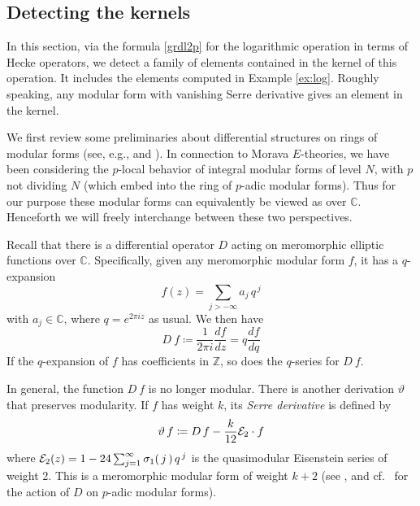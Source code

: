 \documentclass{gtpart}
\theoremstyle{definition}
\theoremstyle{remark}
\newcommand{\mb}[1]{\mathbb{#1}}
\newcommand{\CE}{{\cal E}}
\newcommand{\BC}{{\mb C}}
\newcommand{\BZ}{{\mb Z}}
\newcommand{\si}{\sigma}
\newcommand{\ce}{\coloneqq}
\renewcommand{\=}{\approx}
\renewcommand{\-}{\sim}
\numberwithin{equation}{section}
\numberwithin{thm}{section}
\begin{document}
\subsection{Detecting the kernels}
\label{subsec:thm}

In this section, via the formula \eqref{grdl2p} for the logarithmic operation in terms of Hecke operators, we 
detect a family of elements contained in the kernel of this operation.  
It includes the elements computed in Example \ref{ex:log}.  
Roughly speaking, any modular form with vanishing Serre derivative gives an element in the kernel.  

We first review some preliminaries about differential structures on rings of modular forms 
(see, e.g., \cite[\S5]{1-2-3} and \cite[Section 2.3]{web}).  
In connection to Morava $E$-theories, 
we have been considering the $p$-local behavior of integral modular forms of level $N$, 
with $p$ not dividing $N$ 
(which embed into the ring of $p$-adic modular forms).  
Thus for our purpose these modular forms can equivalently be viewed as over $\BC$.  
Henceforth we will freely interchange between these two perspectives.  

Recall that there is a differential operator $D$ acting on meromorphic elliptic functions over $\BC$.  
Specifically, given any meromorphic modular form $f$, it has a $q$-expansion 
\[
 f(z) = \sum_{j > -\infty} a_j \, q^{\,j} 
\]
with $a_j \in \BC$, where $q = e^{2 \pi i z}$ as usual.  We then have 
\begin{equation}
 \label{ramanujan}
 D ~\! f \ce \frac{1}{2 \pi i} \frac{df}{dz} = q \frac{df}{dq} 
\end{equation}
If the $q$-expansion of $f$ has coefficients in $\BZ$, so does the $q$-series for $D ~\! f$.  

In general, the function $D ~\! f$ is no longer modular.  
There is another derivation $\vartheta$ that preserves modularity.  
If $f$ has weight $k$, its {\em Serre derivative} is defined by 
\begin{equation}
 \label{serre}
 \vartheta ~\! f \ce D ~\! f - \frac{k}{12} \CE_2 \cdot f 
\end{equation}
where $\CE_2(z) = 1 - 24 \sum_{j=1}^\infty \si_1(\,j\,) \, q^{\,j}$ is the quasimodular Eisenstein series of weight 2.  
This is a meromorphic modular form of weight $k + 2$ (see \cite[Proposition 2.11]{web}, 
and cf.~\cite[Th\'eor\`eme 5(a)]{fmpadiq} for the action of $D$ on $p$-adic modular forms).  
\end{document}
